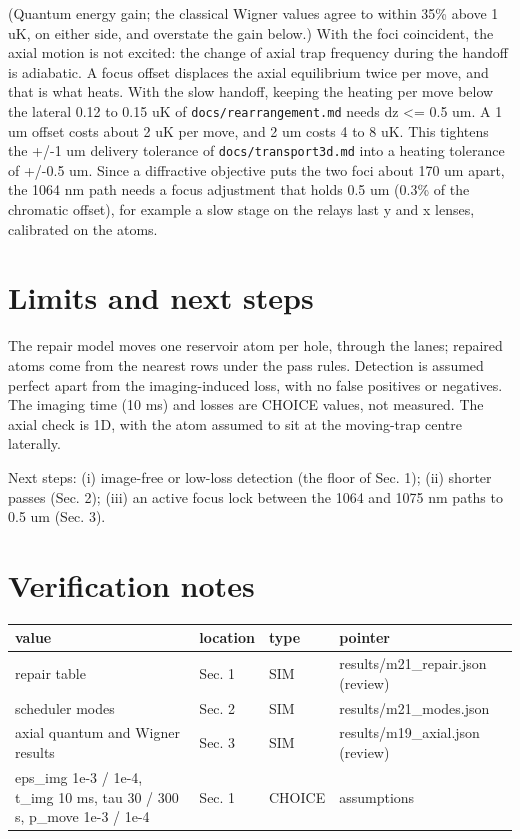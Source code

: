 (Quantum energy gain; the classical Wigner values agree to within 35\%
above 1 uK, on either side, and overstate the gain below.) With the foci
coincident, the axial motion is not excited: the change of axial trap
frequency during the handoff is adiabatic. A focus offset displaces the
axial equilibrium twice per move, and that is what heats. With the slow
handoff, keeping the heating per move below the lateral 0.12 to 0.15 uK
of \texttt{docs/rearrangement.md} needs dz \textless= 0.5 um. A 1 um
offset costs about 2 uK per move, and 2 um costs 4 to 8 uK. This
tightens the +/-1 um delivery tolerance of \texttt{docs/transport3d.md}
into a heating tolerance of +/-0.5 um. Since a diffractive objective
puts the two foci about 170 um apart, the 1064 nm path needs a focus
adjustment that holds 0.5 um (0.3\% of the chromatic offset), for
example a slow stage on the relay\textquotesingle s last y and x lenses,
calibrated on the atoms.

\hypertarget{4-limits-and-next-steps}{%
\section{Limits and next steps}\label{repair-4-limits-and-next-steps}}

The repair model moves one reservoir atom per hole, through the lanes;
repaired atoms come from the nearest rows under the pass rules.
Detection is assumed perfect apart from the imaging-induced loss, with
no false positives or negatives. The imaging time (10 ms) and losses are
CHOICE values, not measured. The axial check is 1D, with the atom
assumed to sit at the moving-trap centre laterally.

Next steps: (i) image-free or low-loss detection (the floor of Sec. 1);
(ii) shorter passes (Sec. 2); (iii) an active focus lock between the
1064 and 1075 nm paths to 0.5 um (Sec. 3).

\hypertarget{verification-notes}{%
\section{Verification notes}\label{repair-verification-notes}}

{\footnotesize
\begin{longtable}[]{@{}>{\raggedright\arraybackslash}p{0.364\dimexpr(\linewidth-8\tabcolsep)\relax}>{\raggedright\arraybackslash}p{0.133\dimexpr(\linewidth-8\tabcolsep)\relax}>{\raggedright\arraybackslash}p{0.097\dimexpr(\linewidth-8\tabcolsep)\relax}>{\raggedright\arraybackslash}p{0.406\dimexpr(\linewidth-8\tabcolsep)\relax}@{}}
\toprule\noalign{}
value & location & type & pointer \\
\midrule\noalign{}
\endhead
\bottomrule\noalign{}
\endlastfoot
repair table & Sec. 1 & SIM & results/m21\_repair.json (review) \\
scheduler modes & Sec. 2 & SIM & results/m21\_modes.json \\
axial quantum and Wigner results & Sec. 3 & SIM &
results/m19\_axial.json (review) \\
eps\_img 1e-3 / 1e-4, t\_img 10 ms, tau 30 / 300 s, p\_move 1e-3 / 1e-4
& Sec. 1 & CHOICE & assumptions \\
\end{longtable}
}
